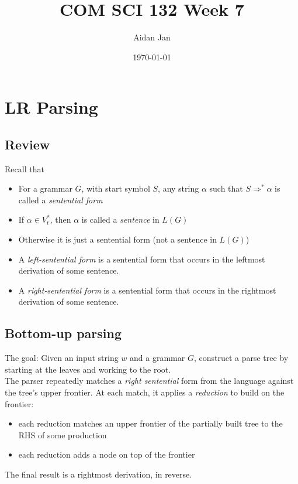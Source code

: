 \documentclass[10pt]{article}
\title{COM SCI 132 Week 7}
\author{Aidan Jan}
\date{\today}
\begin{document}
\maketitle

\section*{LR Parsing}
\subsection*{Review}
Recall that
\begin{itemize}
    \item For a grammar $G$, with start symbol $S$, any string $\alpha$ such that $S \Rightarrow^* \alpha$ is called a \textit{sentential form}
    \item If $\alpha \in V_t^*$, then $\alpha$ is called a \textit{sentence} in $L(G)$
    \item Otherwise it is just a sentential form (not a sentence in $L(G)$)
    \item A \textit{left-sentential form} is a sentential form that occurs in the leftmost derivation of some sentence.
    \item A \textit{right-sentential form} is a sentential form that occurs in the rightmost derivation of some sentence.
\end{itemize}

\subsection*{Bottom-up parsing}
The goal: Given an input string $w$ and a grammar $G$, construct a parse tree by starting at the leaves and working to the root.\\
The parser repeatedly matches a \textit{right sentential} form from the language against the tree's upper frontier.  At each match, it applies a \textit{reduction} to build on the frontier:
\begin{itemize}
    \item each reduction matches an upper frontier of the partially built tree to the RHS of some production
    \item each reduction adds a node on top of the frontier
\end{itemize}
The final result is a rightmost derivation, in reverse.
\end{document}
